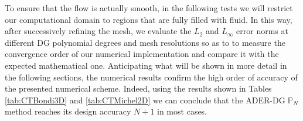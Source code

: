 
To ensure that the flow is actually smooth, in the following tests we will
restrict our computational domain to regions that are fully filled with
fluid. In this way, after successively refining the mesh, we evaluate the
$L_2$ and $L_\infty$ error norms at different DG polynomial
degrees and mesh resolutions so as to to measure the convergence order of
our numerical implementation and compare it with the expected mathematical
one. Anticipating what will be shown in more detail in the following
sections, the numerical results {confirm} the high order of accuracy of
the presented numerical scheme. Indeed, using the results shown in Tables
\ref{tab:CTBondi3D} and \ref{tab:CTMichel2D} 
we can conclude that the ADER-DG
$\mathbb{P}_N$ method reaches its design accuracy $N+1$ in most cases.

